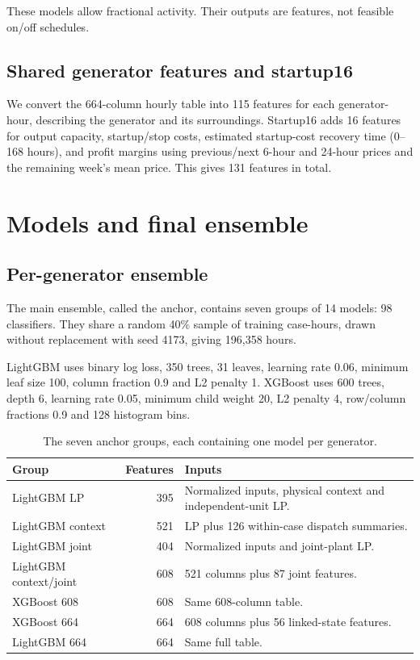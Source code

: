 \documentclass[a4paper,11pt]{article}
\begin{document}
These models allow fractional activity. Their outputs are features, not feasible on/off schedules.

\subsection*{Shared generator features and startup16}
We convert the 664-column hourly table into 115 features for each generator-hour, describing the generator and its surroundings. Startup16 adds 16 features for output capacity, startup/stop costs, estimated startup-cost recovery time (0--168 hours), and profit margins using previous/next 6-hour and 24-hour prices and the remaining week's mean price. This gives 131 features in total.

\section{Models and final ensemble}
\subsection*{Per-generator ensemble}
The main ensemble, called the anchor, contains seven groups of 14 models: 98 classifiers. They share a random 40\% sample of training case-hours, drawn without replacement with seed 4173, giving 196,358 hours.

LightGBM uses binary log loss, 350 trees, 31 leaves, learning rate 0.06, minimum leaf size 100, column fraction 0.9 and L2 penalty 1. XGBoost uses 600 trees, depth 6, learning rate 0.05, minimum child weight 20, L2 penalty 4, row/column fractions 0.9 and 128 histogram bins.

\begin{table}[ht]
\centering\small
\begin{tabular}{p{40mm}rp{86mm}}
\hline
Group & Features & Inputs\\\hline
LightGBM LP & 395 & Normalized inputs, physical context and independent-unit LP.\\
LightGBM context & 521 & LP plus 126 within-case dispatch summaries.\\
LightGBM joint & 404 & Normalized inputs and joint-plant LP.\\
LightGBM context/joint & 608 & 521 columns plus 87 joint features.\\
XGBoost 608 & 608 & Same 608-column table.\\
XGBoost 664 & 664 & 608 columns plus 56 linked-state features.\\
LightGBM 664 & 664 & Same full table.\\\hline
\end{tabular}
\caption{The seven anchor groups, each containing one model per generator.}
\end{table}
\end{document}
